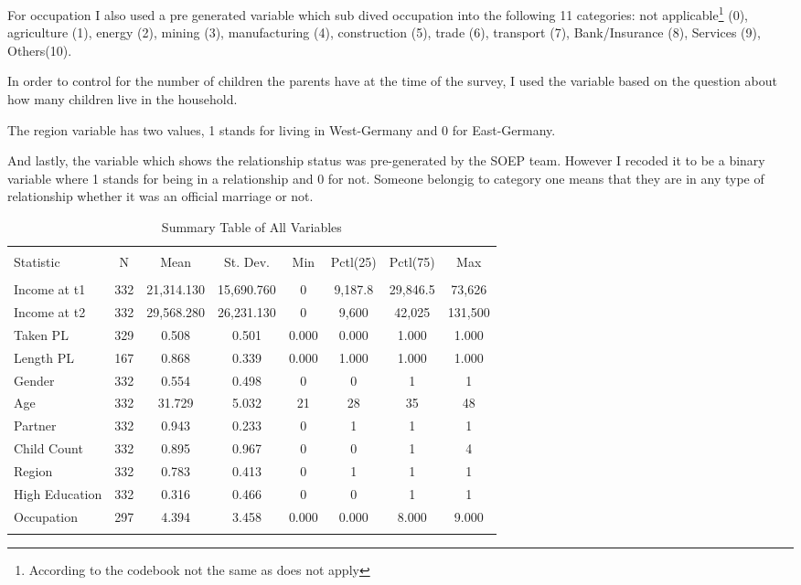 \documentclass[
  12pt,
]{article}
\begin{document}
For occupation I also used a pre generated variable which sub dived occupation into the following 11 categories: not applicable\footnote{According to the codebook not the same as does not apply} (0), agriculture (1), energy (2), mining (3), manufacturing (4), construction (5), trade (6), transport (7), Bank/Insurance (8), Services (9), Others(10).

In order to control for the number of children the parents have at the time of the survey, I used the variable based on the question about how many children live in the household.

The region variable has two values, 1 stands for living in West-Germany and 0 for East-Germany.

And lastly, the variable which shows the relationship status was pre-generated by the SOEP team. However I recoded it to be a binary variable where 1 stands for being in a relationship and 0 for not. Someone belongig to category one means that they are in any type of relationship whether it was an official marriage or not.

\begin{table}[!htbp] \centering 
  \caption{Summary Table of All Variables} 
  \label{tab1} 
\begin{tabular}{@{\extracolsep{5pt}}lccccccc} 
\\[-1.8ex]\hline 
\hline \\[-1.8ex] 
Statistic & \multicolumn{1}{c}{N} & \multicolumn{1}{c}{Mean} & \multicolumn{1}{c}{St. Dev.} & \multicolumn{1}{c}{Min} & \multicolumn{1}{c}{Pctl(25)} & \multicolumn{1}{c}{Pctl(75)} & \multicolumn{1}{c}{Max} \\ 
\hline \\[-1.8ex] 
Income at t1 & 332 & 21,314.130 & 15,690.760 & 0 & 9,187.8 & 29,846.5 & 73,626 \\ 
Income at t2 & 332 & 29,568.280 & 26,231.130 & 0 & 9,600 & 42,025 & 131,500 \\ 
Taken PL  & 329 & 0.508 & 0.501 & 0.000 & 0.000 & 1.000 & 1.000 \\ 
Length PL & 167 & 0.868 & 0.339 & 0.000 & 1.000 & 1.000 & 1.000 \\ 
Gender & 332 & 0.554 & 0.498 & 0 & 0 & 1 & 1 \\ 
Age & 332 & 31.729 & 5.032 & 21 & 28 & 35 & 48 \\ 
Partner & 332 & 0.943 & 0.233 & 0 & 1 & 1 & 1 \\ 
Child Count & 332 & 0.895 & 0.967 & 0 & 0 & 1 & 4 \\ 
Region & 332 & 0.783 & 0.413 & 0 & 1 & 1 & 1 \\ 
High Education & 332 & 0.316 & 0.466 & 0 & 0 & 1 & 1 \\ 
Occupation & 297 & 4.394 & 3.458 & 0.000 & 0.000 & 8.000 & 9.000 \\ 
\hline \\[-1.8ex] 
\end{tabular} 
\end{table}
\end{document}
